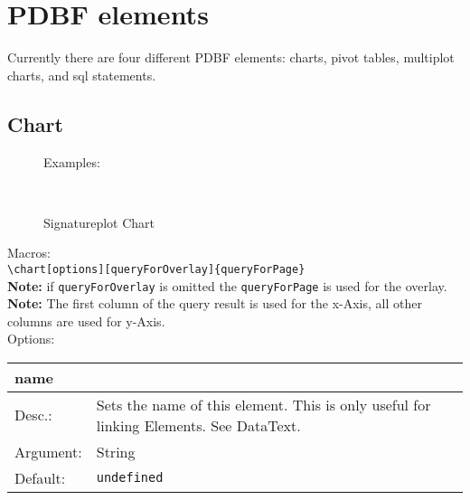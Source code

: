 \documentclass[11pt]{scrartcl}
\def\a{5cm}
\def\b{10.5cm}
\def\option#1#2#3#4{%
\noindent \begin{tabular}{|p{\a}|p{\b}|}
\hline
\textbf{#1} & \\
\hline
Desc.: & #2 \\
\hline
Argument: & #3\\
\hline
Default:& #4\\
\hline
\end{tabular} \\[4pt]%
}
\begin{document}
\newpage
\section{PDBF elements}
Currently there are four different PDBF elements: charts, pivot tables, multiplot charts, and sql statements.

\subsection{Chart}
\begin{figure}[h!]%
\hspace{-218pt}Examples:\\
    \centering
    \begin{minipage}{.48\textwidth}
    \caption{Line Chart}
    \end{minipage}
    \hspace{11pt}
    \begin{minipage}{.48\textwidth}
    \caption{Bar Chart}
    \end{minipage} \\[8pt]
    
    \begin{minipage}{1.0\textwidth}
    \caption{Signatureplot Chart}
    \end{minipage}
\end{figure}

\noindent Macros: \\[3pt]
\verb|\chart[options][queryForOverlay]{queryForPage}| \\
\textbf{Note:} if \verb|queryForOverlay| is omitted the \verb|queryForPage| is used for the overlay.\\
\textbf{Note:} The first column of the query result is used for the x-Axis, all other columns are used for y-Axis.\\[8pt] 
\noindent Options:\\[3pt]
%
\option
{name}
{Sets the name of this element. This is only useful for linking Elements. See DataText.}
{String}
{\texttt{undefined}}
\end{document}
